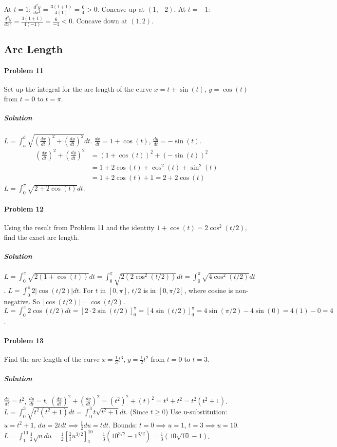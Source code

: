 \documentclass{article}
\begin{document}
At $t=1$: $\frac{d^2y}{dx^2} = \frac{3(1+1)}{4(1)} = \frac{6}{4} > 0$. Concave up at $(1,-2)$.
At $t=-1$: $\frac{d^2y}{dx^2} = \frac{3(1+1)}{4(-1)} = \frac{6}{-4} < 0$. Concave down at $(1,2)$.


\subsection*{Arc Length}

\paragraph{Problem 11}
Set up the integral for the arc length of the curve $x = t + \sin(t)$, $y = \cos(t)$ from $t=0$ to $t=\pi$.

\subparagraph{Solution}
$L = \int_a^b \sqrt{(\frac{dx}{dt})^2 + (\frac{dy}{dt})^2} dt$.
$\frac{dx}{dt} = 1 + \cos(t)$, $\frac{dy}{dt} = -\sin(t)$.
\begin{align*}
(\frac{dx}{dt})^2 + (\frac{dy}{dt})^2 &= (1+\cos(t))^2 + (-\sin(t))^2 \\
&= 1 + 2\cos(t) + \cos^2(t) + \sin^2(t) \\
&= 1 + 2\cos(t) + 1 = 2 + 2\cos(t)
\end{align*}
$L = \int_0^\pi \sqrt{2+2\cos(t)} dt$.

\paragraph{Problem 12}
Using the result from Problem 11 and the identity $1+\cos(t) = 2\cos^2(t/2)$, find the exact arc length.

\subparagraph{Solution}
$L = \int_0^\pi \sqrt{2(1+\cos(t))} dt = \int_0^\pi \sqrt{2(2\cos^2(t/2))} dt = \int_0^\pi \sqrt{4\cos^2(t/2)} dt$.
$L = \int_0^\pi 2|\cos(t/2)| dt$.
For $t$ in $[0, \pi]$, $t/2$ is in $[0, \pi/2]$, where cosine is non-negative. So $|\cos(t/2)| = \cos(t/2)$.
$L = \int_0^\pi 2\cos(t/2) dt = [2 \cdot 2\sin(t/2)]_0^\pi = [4\sin(t/2)]_0^\pi = 4\sin(\pi/2) - 4\sin(0) = 4(1) - 0 = 4$.

\paragraph{Problem 13}
Find the arc length of the curve $x = \frac{1}{3}t^3$, $y = \frac{1}{2}t^2$ from $t=0$ to $t=3$.

\subparagraph{Solution}
$\frac{dx}{dt} = t^2$, $\frac{dy}{dt} = t$.
$(\frac{dx}{dt})^2 + (\frac{dy}{dt})^2 = (t^2)^2 + (t)^2 = t^4 + t^2 = t^2(t^2+1)$.
$L = \int_0^3 \sqrt{t^2(t^2+1)} dt = \int_0^3 t\sqrt{t^2+1} dt$. (Since $t \ge 0$)
Use u-substitution: $u=t^2+1$, $du=2t dt \implies \frac{1}{2}du = t dt$.
Bounds: $t=0 \implies u=1$, $t=3 \implies u=10$.
$L = \int_1^{10} \frac{1}{2}\sqrt{u} du = \frac{1}{2} \left[ \frac{2}{3}u^{3/2} \right]_1^{10} = \frac{1}{3}(10^{3/2} - 1^{3/2}) = \frac{1}{3}(10\sqrt{10} - 1)$.
\end{document}
